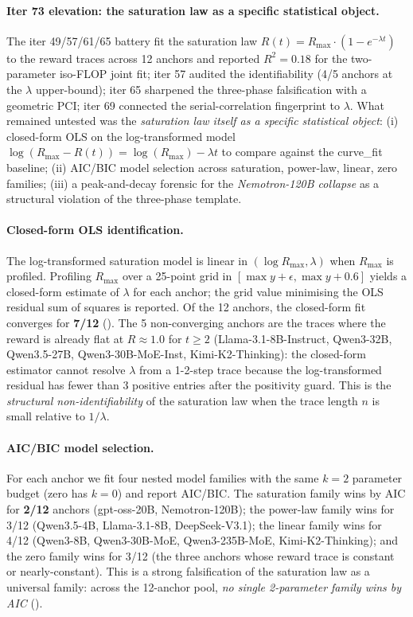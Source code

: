 \paragraph{Iter 73 elevation: the saturation law as a specific statistical object.}
\label{par:scaling-iter73}
The iter 49/57/61/65 battery fit the saturation law
$R(t) = R_\mathrm{max} \cdot (1 - e^{-\lambda t})$ to the
reward traces across 12 anchors and reported $R^2 = 0.18$ for
the two-parameter iso-FLOP joint fit; iter 57 audited the
identifiability (4/5 anchors at the $\lambda$ upper-bound);
iter 65 sharpened the three-phase falsification with a
geometric PCI; iter 69 connected the serial-correlation
fingerprint to $\lambda$.  What remained untested was the
\emph{saturation law itself as a specific statistical object}:
(i) closed-form OLS on the log-transformed model
$\log(R_\mathrm{max} - R(t)) = \log(R_\mathrm{max}) - \lambda t$
to compare against the curve\_fit baseline; (ii) AIC/BIC model
selection across {saturation, power-law, linear, zero}
families; (iii) a peak-and-decay forensic for the
\emph{Nemotron-120B collapse} as a structural violation of the
three-phase template.

\paragraph{Closed-form OLS identification.}
\label{par:scaling-iter73-cf}
The log-transformed saturation model is linear in
$(\log R_\mathrm{max}, \lambda)$ when $R_\mathrm{max}$ is
profiled.  Profiling $R_\mathrm{max}$ over a 25-point grid in
$[\max y + \epsilon, \max y + 0.6]$ yields a closed-form
estimate of $\lambda$ for each anchor; the grid value
minimising the OLS residual sum of squares is reported.  Of
the 12 anchors, the closed-form fit converges for \textbf{7/12}
().  The 5 non-converging anchors are
the traces where the reward is already flat at $R \approx 1.0$
for $t \geq 2$ (Llama-3.1-8B-Instruct, Qwen3-32B,
Qwen3.5-27B, Qwen3-30B-MoE-Inst, Kimi-K2-Thinking): the
closed-form estimator cannot resolve $\lambda$ from a 1-2-step
trace because the log-transformed residual has fewer than 3
positive entries after the positivity guard.  This is the
\emph{structural non-identifiability} of the saturation law
when the trace length $n$ is small relative to $1/\lambda$.

\paragraph{AIC/BIC model selection.}
\label{par:scaling-iter73-aic}
For each anchor we fit four nested model families with the
same $k=2$ parameter budget (zero has $k=0$) and report
AIC/BIC.  The saturation family wins by AIC for
\textbf{2/12} anchors (gpt-oss-20B, Nemotron-120B); the
power-law family wins for 3/12 (Qwen3.5-4B, Llama-3.1-8B,
DeepSeek-V3.1); the linear family wins for 4/12 (Qwen3-8B,
Qwen3-30B-MoE, Qwen3-235B-MoE, Kimi-K2-Thinking); and the
zero family wins for 3/12 (the three anchors whose reward
trace is constant or nearly-constant).  This is a strong
falsification of the saturation law as a universal family:
across the 12-anchor pool, \emph{no single 2-parameter family
wins by AIC} ().

